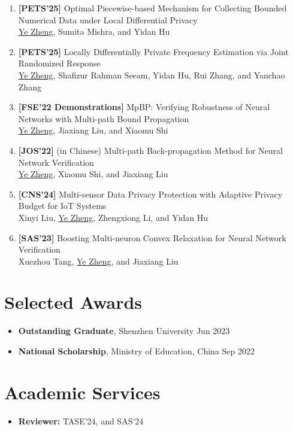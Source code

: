\documentclass[a4paper,11pt]{article}
\begin{document}
\begin{enumerate}[leftmargin=*,labelsep=2mm]
  \item \textbf{[PETS'25]} Optimal Piecewise-based Mechanism for Collecting Bounded Numerical Data under Local Differential Privacy \\
  \uline{Ye Zheng}, Sumita Mishra, and Yidan Hu
  \item \textbf{[PETS'25]} Locally Differentially Private Frequency Estimation via Joint Randomized Response \\
  \uline{Ye Zheng}, Shafizur Rahman Seeam, Yidan Hu, Rui Zhang, and Yanchao Zhang
  \item \textbf{[FSE'22 Demonstrations]} MpBP: Verifying Robustness of Neural Networks with Multi-path Bound Propagation \\
  \uline{Ye Zheng}, Jiaxiang Liu, and Xiaomu Shi
  \item \textbf{[JOS'22]} (in Chinese) Multi-path Back-propagation Method for Neural Network Verification \\
  \uline{Ye Zheng}, Xiaomu Shi, and Jiaxiang Liu
  \item \textbf{[CNS'24]} Multi-sensor Data Privacy Protection with Adaptive Privacy Budget for IoT Systems \\
  Xinyi Liu, \uline{Ye Zheng}, Zhengxiong Li, and Yidan Hu
  \item \textbf{[SAS'23]} Boosting Multi-neuron Convex Relaxation for Neural Network Verification \\
  Xuezhou Tang, \uline{Ye Zheng}, and Jiaxiang Liu
\end{enumerate}


\section{\textbf{Selected Awards}}

\begin{itemize}[leftmargin=0pt,label={}]
  \item \textbf{Outstanding Graduate}, Shenzhen University \hfill Jun 2023\vspace{-0.5em}
  \item \textbf{National Scholarship}, Ministry of Education, China \hfill Sep 2022
\end{itemize}


\section{\textbf{Academic Services}}

\begin{itemize}[leftmargin=0pt,label={}]
  \item \textbf{Reviewer:} TASE'24, and SAS'24
\end{itemize}
\end{document}
